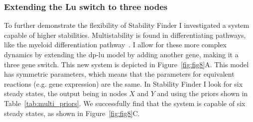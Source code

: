 \clearpage

\subsubsection{Extending the Lu switch to three nodes}
To further demonstrate the flexibility of Stability Finder I investigated a system capable of higher stabilities. Multistability is found in differentiating pathways, like the myeloid differentiation pathway~\autocite{Ghaffarizadeh:2014bt, Cinquin:2005go}. I allow for these more complex dynamics by extending the \acrshort{dp-lu} model by adding another gene, making it a three gene switch.  This new system is depicted in Figure~\ref{fig:fig8}A. This model has symmetric parameters, which means that the parameters for equivalent reactions (e.g. gene expression) are the same. In Stability Finder I look for six steady states, the output being in nodes $X$ and $Y$ and using the priors shown in Table~\ref{tab:multi_priors}. We successfully find that the system is capable of six steady states, as shown in Figure~\ref{fig:fig8}C. 


